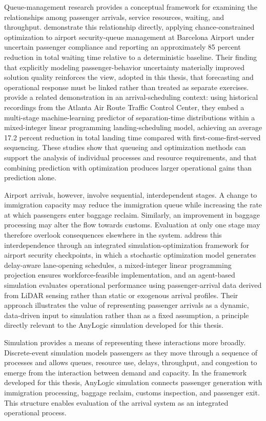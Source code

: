 Queue-management research provides a conceptual framework for examining the relationships among passenger arrivals, service resources, waiting, and throughput. \textcite{cao2025robust} demonstrate this relationship directly, applying chance-constrained optimization to airport security-queue management at Barcelona Airport under uncertain passenger compliance and reporting an approximately 85 percent reduction in total waiting time relative to a deterministic baseline. Their finding that explicitly modeling passenger-behavior uncertainty materially improved solution quality reinforces the view, adopted in this thesis, that forecasting and operational response must be linked rather than treated as separate exercises. \textcite{pang2024machine} provide a related demonstration in an arrival-scheduling context: using historical recordings from the Atlanta Air Route Traffic Control Center, they embed a multi-stage machine-learning predictor of separation-time distributions within a mixed-integer linear programming landing-scheduling model, achieving an average 17.2 percent reduction in total landing time compared with first-come-first-served sequencing. These studies show that queueing and optimization methods can support the analysis of individual processes and resource requirements, and that combining prediction with optimization produces larger operational gains than prediction alone.

Airport arrivals, however, involve sequential, interdependent stages. A change to immigration capacity may reduce the immigration queue while increasing the rate at which passengers enter baggage reclaim. Similarly, an improvement in baggage processing may alter the flow towards customs. Evaluation at only one stage may therefore overlook consequences elsewhere in the system. \textcite{sang2026integrating} address this interdependence through an integrated simulation-optimization framework for airport security checkpoints, in which a stochastic optimization model generates delay-aware lane-opening schedules, a mixed-integer linear programming projection ensures workforce-feasible implementation, and an agent-based simulation evaluates operational performance using passenger-arrival data derived from LiDAR sensing rather than static or exogenous arrival profiles. Their approach illustrates the value of representing passenger arrivals as a dynamic, data-driven input to simulation rather than as a fixed assumption, a principle directly relevant to the AnyLogic simulation developed for this thesis.

Simulation provides a means of representing these interactions more broadly. Discrete-event simulation models passengers as they move through a sequence of processes and allows queues, resource use, delays, throughput, and congestion to emerge from the interaction between demand and capacity. In the framework developed for this thesis, AnyLogic simulation connects passenger generation with immigration processing, baggage reclaim, customs inspection, and passenger exit. This structure enables evaluation of the arrival system as an integrated operational process.

